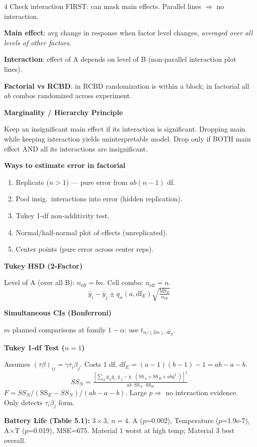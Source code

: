 \documentclass[7pt,letterpaper,landscape]{extarticle}
\newcommand{\subsec}[1]{\vspace{1pt}\textbf{\small #1}\par}
\newcommand{\MSE}{\mathrm{MS}_E}
\newcommand{\SSE}{\mathrm{SS}_E}
\newcommand{\SSA}{\mathrm{SS}_A}
\begin{document}
\begin{multicols*}{4}
Check interaction FIRST: can mask main effects. Parallel lines $\Rightarrow$ no interaction.

\textbf{Main effect}: avg change in response when factor level changes, \emph{averaged over all levels of other factors}.

\textbf{Interaction}: effect of A depends on level of B (non-parallel interaction plot lines).

\textbf{Factorial vs RCBD}: in RCBD randomization is within a block; in factorial all $ab$ combos randomized across experiment.

\subsec{Marginality / Hierarchy Principle}
Keep an insignificant main effect if its interaction is significant. Dropping main while keeping interaction yields uninterpretable model. Drop only if BOTH main effect AND all its interactions are insignificant.

\subsec{Ways to estimate error in factorial}
\begin{enumerate}[leftmargin=10pt]
\item Replicate ($n{>}1$) — pure error from $ab(n{-}1)$ df.
\item Pool insig.\ interactions into error (hidden replication).
\item Tukey 1-df non-additivity test.
\item Normal/half-normal plot of effects (unreplicated).
\item Center points (pure error across center reps).
\end{enumerate}

\subsec{Tukey HSD (2-Factor)}
Level of A (over all B): $n_{\text{eff}}{=}bn$. Cell combo: $n_{\text{eff}}{=}n$.
\[\bar y_i{-}\bar y_j\pm q_\alpha(a,\text{df}_E)\sqrt{\tfrac{\MSE}{n_{\text{eff}}}}\]

\subsec{Simultaneous CIs (Bonferroni)}
$m$ planned comparisons at family $1{-}\alpha$: use $t_{\alpha/(2m),\text{df}_E}$.

\subsec{Tukey 1-df Test ($n{=}1$)}
Assumes $(\tau\beta)_{ij}{=}\gamma\tau_i\beta_j$. Costs 1 df. df$_E{=}(a{-}1)(b{-}1){-}1{=}ab{-}a{-}b$.
\[SS_N{=}\tfrac{[\sum_{ij}y_{ij}\bar y_{i\cdot}\bar y_{\cdot j}-\bar y_{\cdot\cdot}(\SSA{+}\mathrm{SS}_B{+}ab\bar y_{\cdot\cdot}^2)]^2}{ab\cdot\SSA\cdot\mathrm{SS}_B}\]
$F{=}SS_N/(\SSE{-}SS_N)/(ab{-}a{-}b)$. Large $p\Rightarrow$ no interaction evidence. Only detects $\tau_i\beta_j$ form.

\textbf{Battery Life (Table 5.1):} $3\times3$, $n=4$. A ($p$=0.002), Temperature ($p$=1.9e-7), A$\times$T ($p$=0.019), MSE=675. Material 1 worst at high temp; Material 3 best overall.


\end{multicols*}
\end{document}
